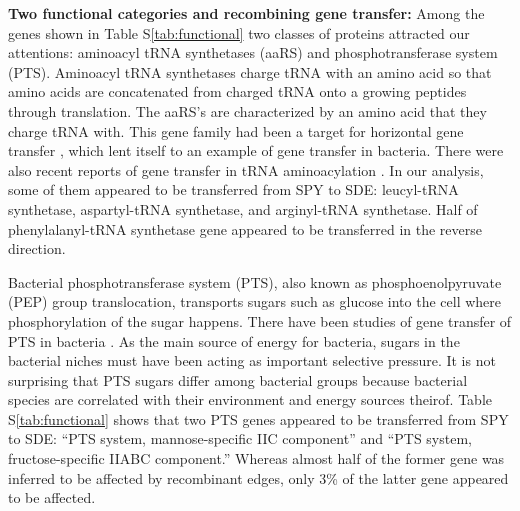 \documentclass[english]{article}
\begin{document}
\textbf{Two functional categories and recombining gene transfer:}
Among the genes shown in Table S\ref{tab:functional} two classes of proteins
attracted our attentions: aminoacyl tRNA synthetases (aaRS) and
phosphotransferase system (PTS).  Aminoacyl tRNA synthetases charge tRNA with an
amino acid so that amino acids are concatenated from charged tRNA onto a growing
peptides through translation. The aaRS's are characterized by an amino acid that
they charge tRNA with.  This gene family had been a target for horizontal gene
transfer \citep[e.g.,][]{Lamour1994,Woese2000,Koonin2001}, which lent itself to
an example of gene transfer in bacteria.  There were also recent reports of gene
transfer in tRNA aminoacylation \citep{Andam2010,Wang2011}.  In our analysis,
some of them appeared to be transferred from SPY to SDE: leucyl-tRNA synthetase,
aspartyl-tRNA synthetase, and arginyl-tRNA synthetase. Half of phenylalanyl-tRNA
synthetase gene appeared to be transferred in the reverse direction. 

Bacterial phosphotransferase system (PTS), also known as phosphoenolpyruvate
(PEP) group translocation, transports sugars such as glucose into the cell where
phosphorylation of the sugar happens. There have been studies of gene transfer
of PTS in bacteria \citep[e.g.,][]{Barabote2005,Zuniga2005}. As the main source
of energy for bacteria, sugars in the bacterial niches must have been acting as
important selective pressure. It is not surprising that PTS sugars differ among
bacterial groups because bacterial species are correlated with their environment
and energy sources theirof.  Table S\ref{tab:functional} shows that two PTS
genes appeared to be transferred from SPY to SDE: {}``PTS system,
mannose-specific IIC component'' and {}``PTS system, fructose-specific IIABC
component.'' Whereas almost half of the former gene was inferred to be affected
by recombinant edges, only 3\% of the latter gene appeared to be affected. 
\end{document}

